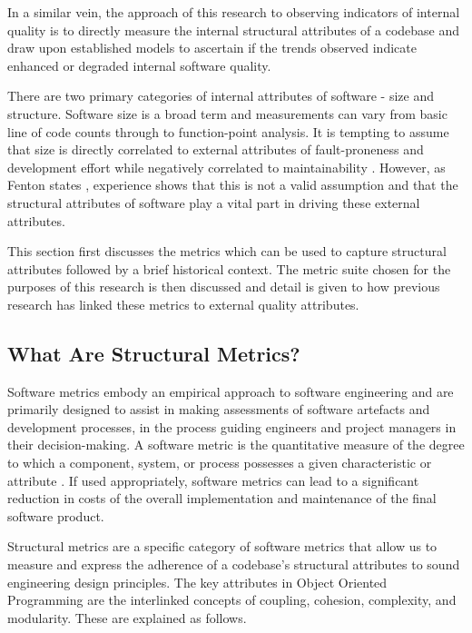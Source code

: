 In a similar vein, the approach of this research to observing indicators of internal quality is to directly measure the internal structural attributes of a codebase and draw upon established models to ascertain if the trends observed indicate enhanced or degraded internal software quality.

There are two primary categories of internal attributes of software - size and structure. Software size is a broad term and measurements can vary from basic line of code counts through to function-point analysis. It is tempting to assume that size is directly correlated to external attributes of fault-proneness and development effort while negatively correlated to maintainability \citep{akiyama1971example}. However, as Fenton states \citep{fenton2014software}, experience shows that this is not a valid assumption and that the structural attributes of software play a vital part in driving these external attributes.
 
This section first discusses the metrics which can be used to capture structural attributes followed by a brief historical context. The metric suite chosen for the purposes of this research is then discussed and detail is given to how previous research has linked these metrics to external quality attributes.

\subsection{What Are Structural Metrics?}
Software metrics embody an empirical approach to software engineering and are primarily designed to assist in making assessments of software artefacts and development processes, in the process guiding engineers and project managers in their decision-making. A software metric is the quantitative measure of the degree to which a component, system, or process possesses a given characteristic or attribute \citep{ordonez2008state}. If used appropriately, software metrics can lead to a significant reduction in costs of the overall implementation and maintenance of the final software product. 

Structural metrics are a specific category of software metrics that allow us to measure and express the adherence of a codebase's structural attributes to sound engineering design principles. The key attributes in Object Oriented Programming are the interlinked concepts of coupling, cohesion, complexity, and modularity. These are explained as follows.

